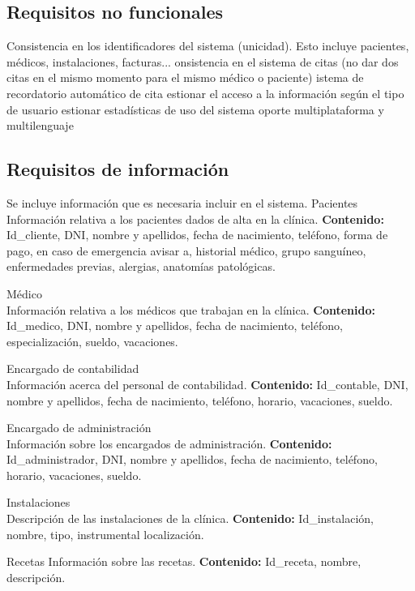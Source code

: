 \documentclass[11pt,a4paper]{article}
\newcommand{\rn}[1]{#1}
\newcommand{\ri}[1]{#1}
\begin{document}
    \subsection{Requisitos no funcionales}
  \rn{Consistencia en los identificadores del sistema (unicidad). Esto incluye pacientes, médicos, instalaciones, facturas...}
  \rn{onsistencia en el sistema de citas (no dar dos citas en el mismo momento para el mismo médico o paciente)}
  \rn{istema de recordatorio automático de cita}
  \rn{estionar el acceso a la información según el tipo de usuario}
  \rn{estionar estadísticas de uso del sistema}
  \rn{oporte multiplataforma y multilenguaje}


  \subsection{Requisitos de información}

  Se incluye información que es necesaria incluir en el sistema.
  \ri{Pacientes}\\
  Información relativa a los pacientes dados de alta en la clínica.
  \textbf{Contenido:} Id\_cliente, DNI, nombre y apellidos, fecha de nacimiento, teléfono, forma de pago, en caso de emergencia avisar a, historial médico, grupo sanguíneo, enfermedades previas, alergias, anatomías patológicas.
  
  \ri{Médico}\\
  Información relativa a los médicos que trabajan en la clínica.
  \textbf{Contenido:} Id\_medico, DNI, nombre y apellidos, fecha de nacimiento, teléfono, especialización, sueldo, vacaciones.
  
  \ri{Encargado de contabilidad}\\
  Información acerca del personal de contabilidad.
  \textbf{Contenido:} Id\_contable, DNI, nombre y apellidos, fecha de nacimiento, teléfono, horario, vacaciones, sueldo.

  \ri{Encargado de administración}\\
  Información sobre los encargados de administración.
  \textbf{Contenido:} Id\_administrador, DNI, nombre y apellidos, fecha de nacimiento, teléfono, horario, vacaciones, sueldo.
  
  \ri{Instalaciones}\\
  Descripción de las instalaciones de la clínica.
  \textbf{Contenido:} Id\_instalación, nombre, tipo, instrumental localización.
  
  \ri{Recetas}
  Información sobre las recetas.
  \textbf{Contenido:} Id_receta, nombre, descripción.
\end{document}
